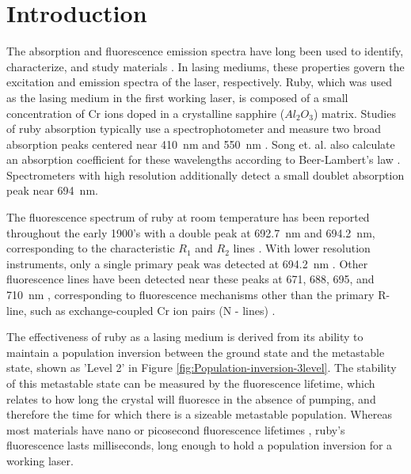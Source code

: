 \documentclass[11pt, a4paper, twocolumn]{article}
\author[1]{William Cutler}
\author[1]{Jack Donaghue}
\author[1]{Haridas Kumarakuru}
\author[1]{Don Heiman}
\affil[1]{\footnotesize{\textit{Department of Physics, Northeastern University, Boston, MA 02115, USA}}}
\begin{document}

\twocolumn[
  \begin{@twocolumnfalse}
    \maketitle
    \begin{abstract}
      \abstractText
      \newline
      \newline
    \end{abstract}
  \end{@twocolumnfalse}
]


\section*{Introduction}
The absorption and fluorescence emission spectra have long been used to identify, characterize, and study materials \cite{BrittanicaSpectroscopy}. In lasing mediums, these properties govern the excitation and emission spectra of the laser, respectively. Ruby, which was used as the lasing medium in the first working laser, is composed of a small concentration of Cr ions doped in a crystalline sapphire ($Al_2O_3$) matrix. Studies of ruby absorption typically use a spectrophotometer and measure two broad absorption peaks centered near \SI{410}{\nm} and \SI{550}{\nm} \cite{Esposti,Kusuma,Song}. Song et. al. also calculate an absorption coefficient for these wavelengths according to Beer-Lambert's law \cite{Song}. Spectrometers with high resolution additionally detect a small doublet absorption peak near \SI{694}{\nm}.

The fluorescence spectrum of ruby at room temperature has been reported throughout the early 1900's with a double peak at \SI{692.7}{\nm} and \SI{694.2}{\nm}, corresponding to the characteristic $R_1$ and $R_2$ lines \cite{Kumari, Mani}. With lower resolution instruments, only a single primary peak was detected at \SI{694.2}{\nm} \cite{Esposti}. Other fluorescence lines have been detected near these peaks at 671, 688, 695, and \SI{710}{\nm} \cite{Kusuma}, corresponding to fluorescence mechanisms other than the primary R-line, such as exchange-coupled Cr ion pairs (N - lines) \cite{Yamaoka}.

The effectiveness of ruby as a lasing medium is derived from its ability to maintain a population inversion between the ground state and the metastable state, shown as 'Level 2' in Figure \ref{fig:Population-inversion-3level}. The stability of this metastable state can be measured by the fluorescence lifetime, which relates to how long the crystal will fluoresce in the absence of pumping, and therefore the time for which there is a sizeable metastable population. Whereas most materials have nano or picosecond fluorescence lifetimes \cite{Berezin}, ruby’s fluorescence lasts milliseconds, long enough to hold a population inversion for a working laser.
\end{document}
